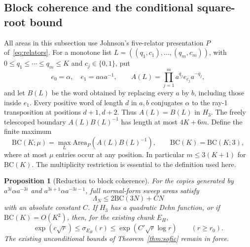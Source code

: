 \documentclass[11pt,a4paper]{article}
\theoremstyle{plain}
\newtheorem{proposition}[theorem]{Proposition}
\theoremstyle{definition}
\theoremstyle{remark}
\begin{document}
\subsection{Block coherence and the conditional square-root bound}

All areas in this subsection use Johnson's five-relator presentation $P$ of~\eqref{eq:relators}.
For a monotone list $L=((q_1,c_1),\ldots,(q_m,c_m))$, with $0\le q_1\le\cdots\le q_m\le K$ and $c_j\in\{0,1\}$, put
\[
 e_0=\alpha,\quad e_1=a\alpha a^{-1},\qquad
 A(L)=\prod_{j=1}^m a^{q_j}e_{c_j}a^{-q_j},
\]
and let $B(L)$ be the word obtained by replacing every $a$ by $b$, including those inside $e_1$.
Every positive word of length $d$ in $a,b$ conjugates $\alpha$ to the ray-1 transposition at positions $d+1,d+2$.
Thus $A(L)=B(L)$ in $H_3$. The freely telescoped boundary $A(L)B(L)^{-1}$ has length at most $4K+6m$.
Define the finite maximum
\[
 \mathrm{BC}(K;\mu)=\max_L\mathrm{Area}_P(A(L)B(L)^{-1}),\qquad
 \mathrm{BC}(K)=\mathrm{BC}(K;3),
\]
where at most $\mu$ entries occur at any position. In particular $m\le3(K+1)$ for $\mathrm{BC}(K)$.
The multiplicity restriction is essential to the definition used here.

\begin{proposition}[Reduction to block coherence]\label{prop:bc-sweep}
For the copies generated by $a^{3i}\alpha a^{-3i}$ and $a^{3i+1}\alpha a^{-3i-1}$, full normal-form sweep areas satisfy
\[
 \Lambda_N\le2\mathrm{BC}(3N)+CN
\]
with an absolute constant $C$. If $H_3$ has a quadratic Dehn function, or if $\mathrm{BC}(K)=O(K^2)$, then, for the existing chunk $E_H$,
\begin{equation}\label{eq:conditional-half}
 \exp(c\sqrt r)\le\sigma_{E_H}(r)\le\exp(C'\sqrt r\log r)\qquad(r\ge r_0).
\end{equation}
The existing unconditional bounds of Theorem~\ref{thm:sofic} remain in force.
\end{proposition}
\end{document}
